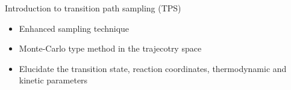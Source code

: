 \documentclass[final]{beamer}
\newlength{\colwidth}
\begin{document}
\begin{frame}[t]
\begin{columns}[t]
\begin{column}{\colwidth}
  \begin{block}{Introduction to transition path sampling (TPS)}
\begin{itemize}
    \item Enhanced sampling technique
    \item Monte-Carlo type method in the trajecotry space \cite{Bolhuis02AnnRevPhysChem53p291}
    \item Elucidate the transition state, reaction coordinates, thermodynamic and kinetic parameters \cite{Frost23JPhysChemB127p144}
\end{itemize}
\begin{figure}%
\centering
{}%
\qquad
{}
\label{fig:tps-desc}%
\end{figure}


\end{block}
\end{column}
\end{columns}
\end{frame}
\end{document}
